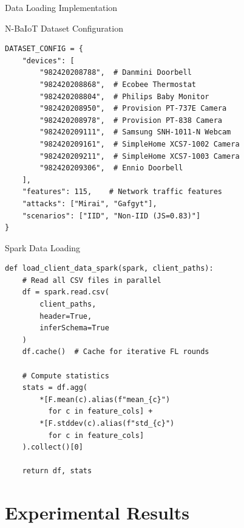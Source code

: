 \documentclass[10pt, aspectratio=169]{beamer}
\begin{document}
\begin{frame}[t]{Data Loading Implementation}
    \begin{block}{N-BaIoT Dataset Configuration}
        \begin{lstlisting}[basicstyle=\ttfamily\scriptsize]
DATASET_CONFIG = {
    "devices": [
        "982420208788",  # Danmini Doorbell
        "982420208868",  # Ecobee Thermostat
        "982420208804",  # Philips Baby Monitor
        "982420208950",  # Provision PT-737E Camera
        "982420208978",  # Provision PT-838 Camera
        "982420209111",  # Samsung SNH-1011-N Webcam
        "982420209161",  # SimpleHome XCS7-1002 Camera
        "982420209211",  # SimpleHome XCS7-1003 Camera
        "982420209306",  # Ennio Doorbell
    ],
    "features": 115,    # Network traffic features
    "attacks": ["Mirai", "Gafgyt"],
    "scenarios": ["IID", "Non-IID (JS=0.83)"]
}
        \end{lstlisting}
    \end{block}
    
    \vspace{0.3cm}
    
    \begin{block}{Spark Data Loading}
        \begin{lstlisting}[basicstyle=\ttfamily\scriptsize]
def load_client_data_spark(spark, client_paths):
    # Read all CSV files in parallel
    df = spark.read.csv(
        client_paths,
        header=True,
        inferSchema=True
    )
    df.cache()  # Cache for iterative FL rounds
    
    # Compute statistics
    stats = df.agg(
        *[F.mean(c).alias(f"mean_{c}") 
          for c in feature_cols] +
        *[F.stddev(c).alias(f"std_{c}") 
          for c in feature_cols]
    ).collect()[0]
    
    return df, stats
        \end{lstlisting}
    \end{block}
\end{frame}


\section{Experimental Results}
\end{document}
